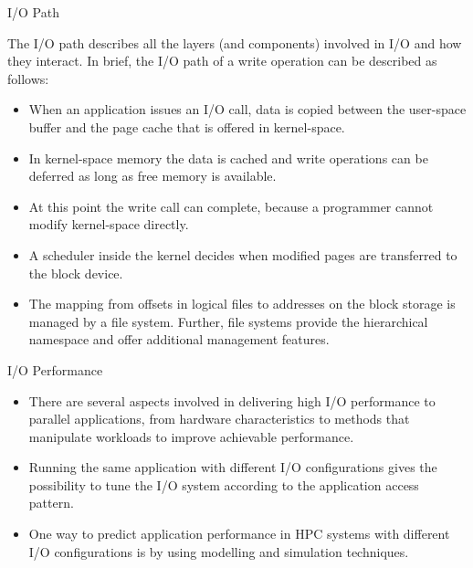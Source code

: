 \documentclass[compress,11pt,xcolor=svgnames,aspectratio=169]{beamer}
\begin{document}
\begin{frame}[t]{I/O Path}

The I/O path describes all the layers (and components) involved in I/O and how they interact.
In brief, the I/O path of a write operation can be described as follows:

    \begin{itemize}

        \item When an application issues an I/O call, data is copied between the user-space buffer and the page cache that is offered in kernel-space.

        \item In kernel-space memory the data is cached and write operations can be deferred as long as free memory is available.

        \item At this point the write call can complete, because a programmer cannot modify kernel-space directly.

        \item A scheduler inside the kernel decides when modified pages are transferred to the block device.

        \item The mapping from offsets in logical files to addresses on the block storage is managed by a file system. Further, file systems provide the hierarchical namespace and offer additional management features.

    \end{itemize}

\end{frame}

\begin{frame}[t]{I/O Performance}

\begin{itemize}
\setlength\itemsep{0.6cm}

  \item There are several aspects involved in delivering high I/O performance to parallel applications, from hardware characteristics to methods that manipulate workloads to improve achievable performance.

  \item Running the same application with different I/O configurations gives the possibility to tune the I/O system according to the application access pattern.

  \item One way to predict application performance in HPC systems with different I/O configurations is by using modelling and simulation techniques.

\end{itemize}

\end{frame}
\end{document}
